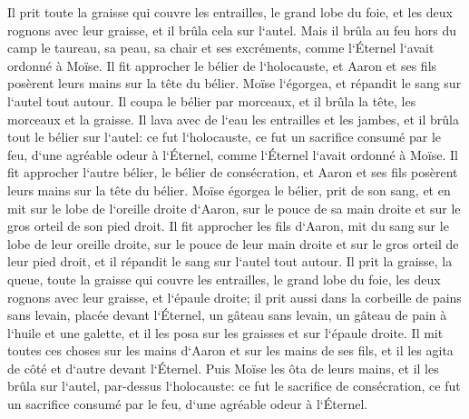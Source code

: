 \verse Il prit toute la graisse qui couvre les entrailles, le grand lobe du foie, et les deux rognons avec leur graisse, et il brûla cela sur l`autel. 
\verse Mais il brûla au feu hors du camp le taureau, sa peau, sa chair et ses excréments, comme l`Éternel l`avait ordonné à Moïse. 
\verse Il fit approcher le bélier de l`holocauste, et Aaron et ses fils posèrent leurs mains sur la tête du bélier. 
\verse Moïse l`égorgea, et répandit le sang sur l`autel tout autour. 
\verse Il coupa le bélier par morceaux, et il brûla la tête, les morceaux et la graisse. 
\verse Il lava avec de l`eau les entrailles et les jambes, et il brûla tout le bélier sur l`autel: ce fut l`holocauste, ce fut un sacrifice consumé par le feu, d`une agréable odeur à l`Éternel, comme l`Éternel l`avait ordonné à Moïse. 
\verse Il fit approcher l`autre bélier, le bélier de consécration, et Aaron et ses fils posèrent leurs mains sur la tête du bélier. 
\verse Moïse égorgea le bélier, prit de son sang, et en mit sur le lobe de l`oreille droite d`Aaron, sur le pouce de sa main droite et sur le gros orteil de son pied droit. 
\verse Il fit approcher les fils d`Aaron, mit du sang sur le lobe de leur oreille droite, sur le pouce de leur main droite et sur le gros orteil de leur pied droit, et il répandit le sang sur l`autel tout autour. 
\verse Il prit la graisse, la queue, toute la graisse qui couvre les entrailles, le grand lobe du foie, les deux rognons avec leur graisse, et l`épaule droite; 
\verse il prit aussi dans la corbeille de pains sans levain, placée devant l`Éternel, un gâteau sans levain, un gâteau de pain à l`huile et une galette, et il les posa sur les graisses et sur l`épaule droite. 
\verse Il mit toutes ces choses sur les mains d`Aaron et sur les mains de ses fils, et il les agita de côté et d`autre devant l`Éternel. 
\verse Puis Moïse les ôta de leurs mains, et il les brûla sur l`autel, par-dessus l`holocauste: ce fut le sacrifice de consécration, ce fut un sacrifice consumé par le feu, d`une agréable odeur à l`Éternel. 

